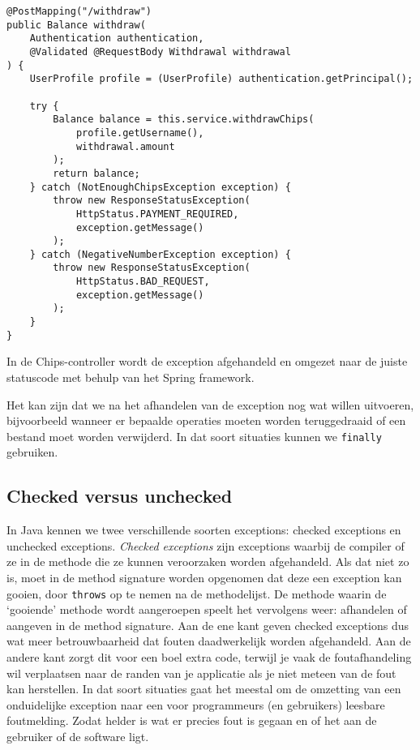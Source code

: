 \documentclass[dutch,a4paper,12pt,doubleside]{book}
\begin{document}
\begin{listing}[H]
\begin{verbatim}
@PostMapping("/withdraw")
public Balance withdraw(
    Authentication authentication, 
    @Validated @RequestBody Withdrawal withdrawal
) {
    UserProfile profile = (UserProfile) authentication.getPrincipal();

    try {
        Balance balance = this.service.withdrawChips(
            profile.getUsername(), 
            withdrawal.amount
        );
        return balance;
    } catch (NotEnoughChipsException exception) {
        throw new ResponseStatusException(
            HttpStatus.PAYMENT_REQUIRED, 
            exception.getMessage()
        );
    } catch (NegativeNumberException exception) {
        throw new ResponseStatusException(
            HttpStatus.BAD_REQUEST, 
            exception.getMessage()
        );
    }
}
\end{verbatim}
\caption{In de Chips-controller wordt de exception afgehandeld 
en omgezet naar de juiste statuscode met behulp van het Spring framework.}
\label{code:chips-throw}
\end{listing}

Het kan zijn dat we na het afhandelen van de exception nog wat willen uitvoeren,
bijvoorbeeld wanneer er bepaalde operaties moeten worden teruggedraaid of een bestand 
moet worden verwijderd. In dat soort situaties kunnen we \texttt{finally} gebruiken.

\subsection{Checked versus unchecked}
In Java kennen we twee verschillende soorten exceptions: 
checked exceptions en unchecked exceptions.
\textit{Checked exceptions} zijn exceptions waarbij de compiler 
 of ze in de methode die ze kunnen veroorzaken worden afgehandeld.
Als dat niet zo is, moet in de method signature worden opgenomen dat deze 
een exception kan gooien, door \texttt{throws} op te nemen na de methodelijst.
De methode waarin de `gooiende' methode wordt aangeroepen speelt het vervolgens weer:
afhandelen of aangeven in de method signature. Aan de ene kant geven checked exceptions 
dus wat meer betrouwbaarheid dat fouten daadwerkelijk worden afgehandeld. Aan de andere kant 
zorgt dit voor een boel extra code, terwijl je vaak de foutafhandeling wil verplaatsen 
naar de randen van je applicatie als je niet meteen van de fout kan herstellen. 
In dat soort situaties gaat het meestal om de omzetting van een onduidelijke exception 
naar een voor programmeurs (en gebruikers) leesbare foutmelding. Zodat helder is 
wat er precies fout is gegaan en of het aan de gebruiker of de software ligt.
\end{document}
